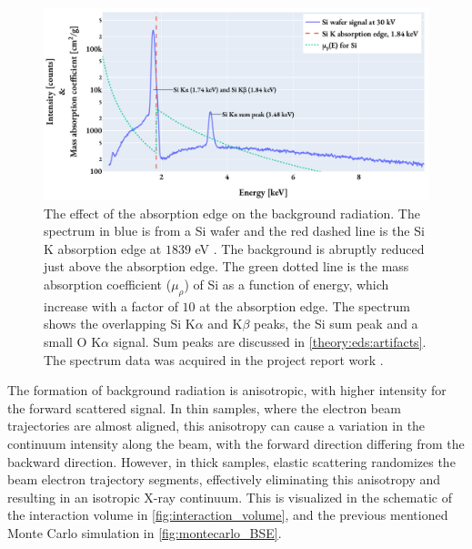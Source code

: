 \begin{figure}[pht]
    \centering
    \includegraphics[width=0.95\linewidth]{figures/background_absorptionEdge_Si.pdf}
    \caption{
        The effect of the absorption edge on the background radiation.
        The spectrum in blue is from a Si wafer and the red dashed line is the Si K absorption edge at $1839$ eV \cite{absorptionEdges_1967,hyperspy_1.7.1}.
        The background is abruptly reduced just above the absorption edge.
        The green dotted line is the mass absorption coefficient ($\mu_\rho$) of Si as a function of energy, which increase with a factor of $10$ at the absorption edge.
        The spectrum shows the overlapping Si K$\alpha$ and K$\beta$ peaks, the Si sum peak and a small O K$\alpha$ signal.
        Sum peaks are discussed in \cref{theory:eds:artifacts}.
        The spectrum data was acquired in the project report work \cite{project_report}.
    }
    \label{fig:background_absorptionEdgeSi}
\end{figure}




The formation of background radiation is anisotropic, with higher intensity for the forward scattered signal.
In thin samples, where the electron beam trajectories are almost aligned, this anisotropy can cause a variation in the continuum intensity along the beam, with the forward direction differing from the backward direction.
However, in thick samples, elastic scattering randomizes the beam electron trajectory segments, effectively eliminating this anisotropy and resulting in an isotropic X-ray continuum.
This is visualized in the schematic of the interaction volume in \cref{fig:interaction_volume}, and the previous mentioned Monte Carlo simulation in \cref{fig:montecarlo_BSE}.



